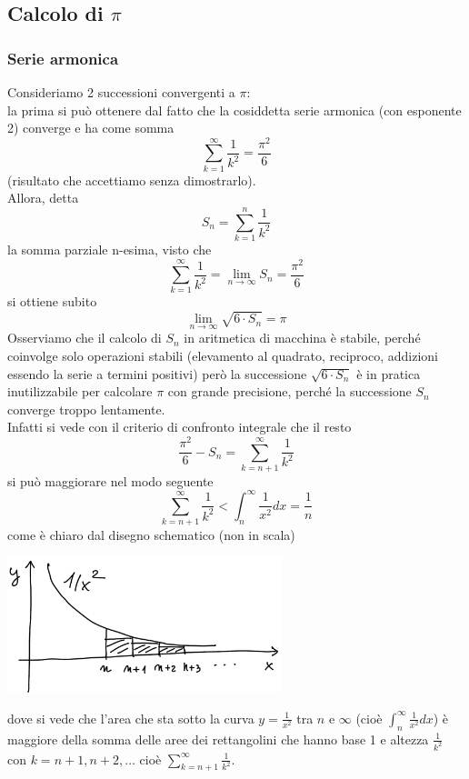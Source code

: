 \subsection{Calcolo di $\pi$}
\subsubsection{Serie armonica}
Consideriamo 2 successioni convergenti a $\pi$:\\
la prima si può ottenere dal fatto che la cosiddetta serie armonica (con esponente 2) converge e ha come somma
\[ \sum_{k=1}^\infty \frac{1}{k^2} = \frac{\pi^2}{6} \]
(risultato che accettiamo senza dimostrarlo).\\
Allora, detta \[S_n = \sum_{k=1}^n \frac{1}{k^2}\] la somma parziale n-esima, visto che 
\[ \sum_{k=1}^\infty \frac{1}{k^2} = \lim_{n \to \infty} S_n = \frac{\pi^2}{6} \] si ottiene subito \[\lim_{n \to \infty} \sqrt{6\cdot S_n} = \pi \]
Osserviamo che il calcolo di $S_n$ in aritmetica di macchina è stabile, perché coinvolge solo operazioni stabili (elevamento al quadrato, reciproco, addizioni essendo la serie a termini positivi) però la successione $\sqrt{6\cdot S_n}$ è
in pratica inutilizzabile per calcolare $\pi$ con grande precisione, perché la successione $S_n$ converge troppo lentamente.\\
Infatti si vede con il criterio di confronto integrale che il resto 
\[ \frac{\pi^2}{6} - S_n = \sum\limits_{k=n+1}^\infty \frac{1}{k^2} \] 
si può maggiorare nel modo seguente
\[ \sum_{k=n+1}^\infty \frac{1}{k^2} < \int_n^\infty \frac{1}{x^2} dx = \frac{1}{n} \]
come è chiaro dal disegno schematico (non in scala)\\
\begin{center}
    \includegraphics[width=0.6\textwidth]{foto/img13}
\end{center}
dove si vede che l'area che sta sotto la curva $y= \frac{1}{x^2}$ tra $n$ e $\infty$ (cioè $\int_n^\infty \frac{1}{x^2}dx$) è maggiore della somma delle aree dei rettangolini che hanno base 1 e altezza $\frac{1}{k^2}$ con $k = n+1, n+2, \dotsc$ cioè $\sum_{k=n+1}^\infty \frac{1}{k^2}$. \\
